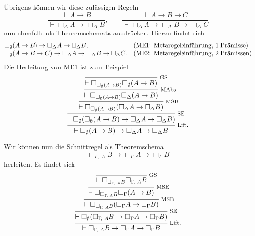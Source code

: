 \documentclass[9pt,fleqn,aspectratio=169]{beamer}
\newcommand{\lnec}{\Box}
\newcommand{\inote}[1]{{\!\footnotesize #1}}
\begin{document}
\begin{frame}
Übrigens können wir diese zulässigen Regeln
\[\dfrac{\vdash A\to B}{\vdash\lnec_\Delta A\to\lnec_\Delta B},\qquad
\dfrac{\vdash A\to B\to C}{\vdash\lnec_\Delta A\to\lnec_\Delta B\to\lnec_\Delta C}\]
nun ebenfalls als Theoremschemata ausdrücken. Hierzu findet sich 
\[\begin{array}{@{}l@{\quad}l@{}}
\lnec_\emptyset (A\to B) \to\lnec_\Delta A\to\lnec_\Delta B, & \text{(ME1: Metaregeleinführung, 1 Prämisse)}\\
\lnec_\emptyset (A\to B\to C) \to\lnec_\Delta A\to\lnec_\Delta B\to\lnec_\Delta C. & \text{(ME2: Metaregeleinführung, 2 Prämissen)}
\end{array}\]\pause
Die Herleitung von ME1 ist zum Beispiel\pause
\[\begin{prooftree}
        \infer0[\!\footnotesize GS\!\!]{\vdash\lnec_{\lnec_\emptyset (A\to B)}\lnec_\emptyset (A\to B)}
      \infer1[\inote{MAbs}]{\vdash\lnec_{\lnec_\emptyset (A\to B)}\lnec_\Delta (A\to B)}
    \infer1[\inote{MSB}]{\vdash\lnec_{\lnec_\emptyset (A\to B)}(\lnec_\Delta A\to\lnec_\Delta B)}
  \infer1[\inote{SE}]{\vdash\lnec_\emptyset(\lnec_\emptyset (A\to B)\to\lnec_\Delta A\to\lnec_\Delta B)}
\infer1[\inote{Lift}.]{\vdash\lnec_\emptyset (A\to B)\to\lnec_\Delta A\to\lnec_\Delta B}
\end{prooftree}\]
\end{frame}

\begin{frame}
Wir können nun die Schnittregel als Theoremschema
\[\lnec_{\Gamma\!,\,\,A}B\to\lnec_\Gamma A\to\lnec_\Gamma B\]
herleiten. Es findet sich\pause{}
\[\begin{prooftree}
        \infer0[\!\footnotesize GS\!\!]{\vdash\lnec_{\lnec_{\Gamma\!,\,\,A}B}\lnec_{\Gamma\!,\,\,A}B}
      \infer1[\inote{MSE}]{\vdash\lnec_{\lnec_{\Gamma\!,\,\,A}B}\lnec_\Gamma (A\to B)}
    \infer1[\inote{MSB}]{\vdash\lnec_{\lnec_{\Gamma\!,\,\,A}B}(\lnec_\Gamma A\to\lnec_\Gamma B)}
  \infer1[\inote{SE}]{\vdash\lnec_\emptyset(\lnec_{\Gamma\!,\,\,A}B\to\lnec_\Gamma A\to\lnec_\Gamma B)}
\infer1[\inote{Lift}.]{\vdash\lnec_{\Gamma\!,\,\,A}B\to\lnec_\Gamma A\to\lnec_\Gamma B}
\end{prooftree}\]
\end{frame}
\end{document}
